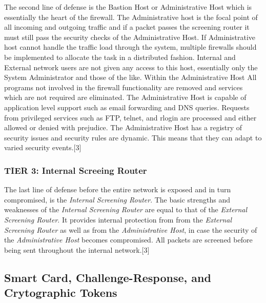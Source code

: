 \documentclass[11pt,onecolumn,cspaper,compsoc]{IEEEtran}
\begin{document}
The second line of defense is the Bastion Host or Administrative Host which is essentially the heart of the firewall. The Administrative host 
is the focal point of all incoming and outgoing traffic and if a packet passes the screening router it must still pass the security checks of 
the Administrative Host. If Administrative host cannot handle the traffic load through the system, multiple firewalls should be implemented to 
allocate the task in a distributed fashion. Internal and External network users are not given any access to this host, essentially only the 
System Administrator and those of the like. Within the Administrative Host All programs not involved in the firewall functionality are removed 
and services which are not required are eliminated. The Administrative Host is capable of application level support such as email forwarding 
and DNS queries. Requests from privileged services such as FTP, telnet, and rlogin are processed and either allowed or denied with prejudice. 
The Administrative Host has a registry of security issues and security rules are dynamic. This means that they can adapt to varied security 
events.[3]

\subsubsection*{TIER 3: Internal Screeing Router}

The last line of defense before the entire network is exposed and in turn compromised, is the \textit{Internal Screening Router}. The basic strengths and weaknesses of the 
\textit{Internal Screening Router} are equal to that of the \textit{External Screening Router}. It provides internal protection from from the \textit{External Screening Router} as well as from 
the \textit{Administrative Host}, in case the security of the \textit{Administrative Host} becomes compromised. All packets are screened before being sent throughout the internal network.[3]

\subsection{Smart Card, Challenge-Response, and Crytographic Tokens}
\end{document}
